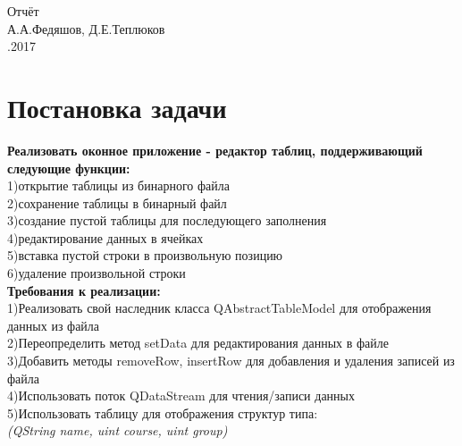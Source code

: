 \documentclass[a4paper]{article}
\begin{document}
	
	\begin{center}
		\hfill \break
		\hfill \break
		\hfill \break
		\hfill \break
		\hfill \break
		\hfill \break
		\hfill \break
		\hfill \break
		\hfill \break
		\hfill\break
		\hfill \break
		\hfill \break
		\hfill \break
		\hfill \break
		\hfill \break
		\hfill \break
		\hfill \break
		{\LARGE Отчёт} \\
		\hfill \break
		А.А.Федяшов, Д.Е.Теплюков\\
		\hfill {}.2017\\
		\hfill \break
		\hfill \break
	\end{center}
	
	
	\thispagestyle{empty} %
	
\newpage

\newpage
	{\section{Постановка задачи}
	\hfill\break
	{\bf 
	Реализовать оконное приложение - редактор таблиц, поддерживающий следующие функции:\\}
	1)открытие таблицы из бинарного файла\\
	2)сохранение таблицы в бинарный файл\\
	3)создание пустой таблицы для последующего заполнения\\
	4)редактирование данных в ячейках\\
	5)вставка пустой строки в произвольную позицию\\
	6)удаление произвольной строки\\
	{\bf Требования к реализации:}\\
	1)Реализовать свой наследник класса QAbstractTableModel для отображения данных из файла\\
	2)Переопределить метод setData для редактирования данных в файле\\
	3)Добавить методы removeRow, insertRow для добавления и удаления записей из файла\\
	4)Использовать поток QDataStream для чтения/записи данных\\
	5)Использовать таблицу для отображения структур типа:\\
	\hfill\break
	\textit{(QString name, uint course, uint group)}\\
}
        
\end{document}
